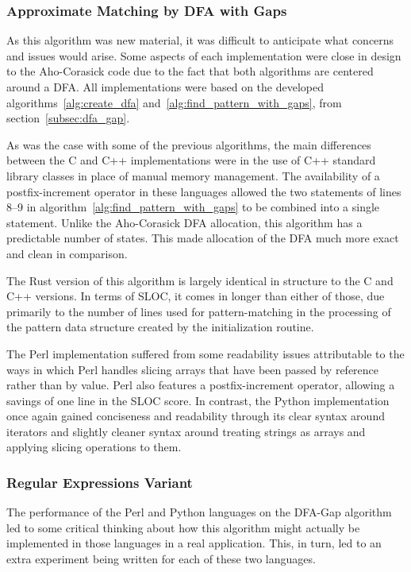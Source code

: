 \subsubsection{Approximate Matching by DFA with Gaps}

As this algorithm was new material, it was difficult to anticipate what concerns and issues would arise. Some aspects of each implementation were close in design to the Aho-Corasick code due to the fact that both algorithms are centered around a DFA. All implementations were based on the developed algorithms~\ref{alg:create_dfa} and~\ref{alg:find_pattern_with_gaps}, from section~\ref{subsec:dfa_gap}.

As was the case with some of the previous algorithms, the main differences between the C and C++ implementations were in the use of C++ standard library classes in place of manual memory management. The availability of a postfix-increment operator in these languages allowed the two statements of lines 8--9 in algorithm~\ref{alg:find_pattern_with_gaps} to be combined into a single statement. Unlike the Aho-Corasick DFA allocation, this algorithm has a predictable number of states. This made allocation of the DFA much more exact and clean in comparison.

The Rust version of this algorithm is largely identical in structure to the C and C++ versions. In terms of SLOC, it comes in longer than either of those, due primarily to the number of lines used for pattern-matching in the processing of the pattern data structure created by the initialization routine.

The Perl implementation suffered from some readability issues attributable to the ways in which Perl handles slicing arrays that have been passed by reference rather than by value. Perl also features a postfix-increment operator, allowing a savings of one line in the SLOC score. In contrast, the Python implementation once again gained conciseness and readability through its clear syntax around iterators and slightly cleaner syntax around treating strings as arrays and applying slicing operations to them.

\subsubsection{Regular Expressions Variant}
\label{subsubsec:dfa_regexp}

The performance of the Perl and Python languages on the DFA-Gap algorithm led to some critical thinking about how this algorithm might actually be implemented in those languages in a real application. This, in turn, led to an extra experiment being written for each of these two languages.

